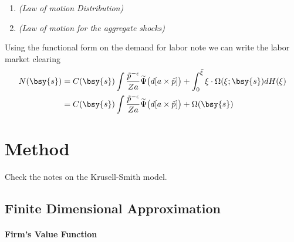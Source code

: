 \documentclass[a4paper,10pt]{article}  %
\begin{document}
\begin{equil}
\begin{enumerate}
   \item \emph{(Law of motion Distribution)}

   
   \item \emph{(Law of motion for the aggregate shocks)}
\end{enumerate}
\end{equil} \normalsize

Using the functional form on the demand for labor note we can write the labor market clearing
\begin{equation}
   \label{eq:labor_market02}
   \begin{split}
      N(\bsy{s}) & = C(\bsy{s}) \int \frac{ \tilde{p}^{-\epsilon} }{Za} \widetilde{\Psi}\big( d[a \times \tilde{p}] \big) + 
             \int_0^{ \bar{\xi} } \xi \cdot \Omega(\xi; \bsy{s} ) dH(\xi) \\
      & = C(\bsy{s}) \int \frac{ \tilde{p}^{-\epsilon} }{Za} \widetilde{\Psi}\big( d[a \times \tilde{p}] \big) + \Omega(\bsy{s})
   \end{split}
\end{equation}



\newpage 
\section{Method} %
\label{sec:method}

Check the notes on the Krusell-Smith model.

\subsection{Finite Dimensional Approximation} %
\label{sub:finite_dimensional_approximation}

\paragraph{Firm's Value Function} %
\label{par:firm_s_value_function}
\end{document}
